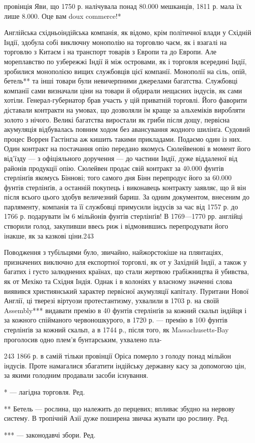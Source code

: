 провінція Яви, що 1750 р. налічувала понад 80.000 мешканців,
1811 р. мала їх лише 8.000. Оце вам doux commerce!*

Англійська східньоіндійська компанія, як відомо, крім політичної
влади у Східній Індії, здобула собі виключну монополію
на торговлю чаєм, як і взагалі на торговлю з Китаєм і на транспорт
товарів з Европи та до Европи. Але мореплавство по узбережжі
Індії й між островами, як і торговля всередині Індії,
зробилися монополією вищих службовців цієї компанії. Монополії
на сіль, опій, бетель** та інші товари були невичерпними
джерелами багатства. Службовці компанії сами визначали ціни
на товари й обдирали нещасних індусів, як сами хотіли. Генерал-губернатор
брав участь у цій приватній торговлі. Його фаворити
діставали контракти на умовах, що дозволяли їм краще за альхеміків
виробляти золото з нічого. Великі багатства виростали
як гриби після дощу, первісна акумуляція відбувалась повним
ходом без авансування жодного шилінґа. Судовий процес Воррен
Гастінґза аж кишить такими прикладами. Подаємо один із
них. Один контракт на постачання опію передано якомусь Сюлейвенові
в момент його від’їзду — з офіціяльного доручення —
до частини Індії, дуже віддаленої від районів продукції опію.
Сюлейвен продає свій контракт за 40.000 фунтів стерлінґів якомусь
Біннові; того самого дня Бінн перепродує його за 60.000 фунтів
стерлінґів, а останній покупець і виконавець контракту заявляє,
що й він після всього цього здобув величезний бариш.
За одним документом, внесеним до парляменту, компанія та її
службовці примусили індусів за час від 1757 р. до 1766 р. подарувати
їм 6 мільйонів фунтів стерлінґів! В 1769—1770 рр.
англійці створили голод, закупивши ввесь риж і відмовившись
перепродувати його інакше, як за казкові ціни.243

Поводження з тубільцями було, звичайно, найжорстокіше
на плянтаціях, призначених виключно для експортної торговлі,
як от у Західній Індії, а також у багатих і густо залюднених
країнах, що стали жертвою грабіжництва й убивства, як от Мехіко
та Східня Індія. Однак і в колоніях у власному значенні
слова виявився християнський характер первісної акумуляції
капіталу. Пуритани Нової Англії, ці тверезі віртуози протестантизму,
ухвалили в 1703 р. на своїй Assembly*** видавати премію
в 40 фунтів стерлінґів за кожний скальп індійця і за кожного
спійманого червоношкурого, в 1720 р. — премію в 100 фунтів
стерлінґів за кожний скальп, а в 1744 р., після того, як Massachusetts-Bay
проголосив одно плем’я бунтарським, ухвалено пла-

243 1866 р. в самій тільки провінції Оріса померло з голоду понад
мільйон індусів. Проте намагалися збагатити індійську державну касу
за допомогою цін, за якими голодним продавали засоби існування.

* — лагідна торговля. Ред.

** Бетель — рослина, що належить до перцевих; впливає збудно на
нервову систему. В тропічній Азії дуже поширена звичка жувати цю рослину.
Ред.

*** — законодавчі збори. Ред.

